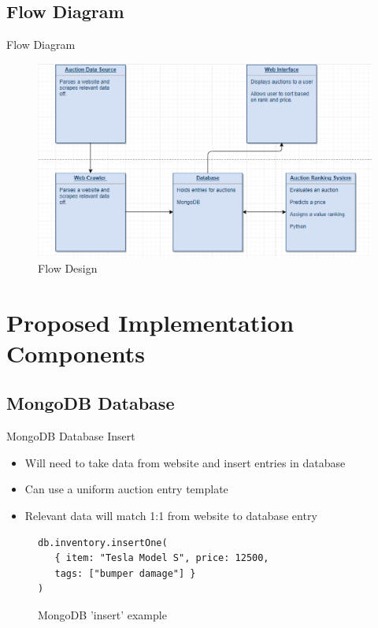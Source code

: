 \documentclass{beamer}
\begin{document}
\subsection{Flow Diagram}

\begin{frame}{Flow Diagram}

\begin{figure}[ht]
\centering
\includegraphics[scale=0.5]{flow_capture}
\caption{Flow Design}
\label{fig:flow}

\end{figure}

\end{frame}

\section{Proposed Implementation Components}

\subsection{MongoDB Database}
\begin{frame}[fragile=singleslide]{MongoDB Database Insert}
\begin{itemize}
\setlength\itemsep{2em}
\item Will need to take data from website and insert entries in database
\item Can use a uniform auction entry template
\item Relevant data will match 1:1 from website to database entry
\end{itemize}
\begin{figure}[ht]
\begin{itemize}


\begin{verbatim}
db.inventory.insertOne(
   { item: "Tesla Model S", price: 12500, 
   tags: ["bumper damage"] }
)
\end{verbatim}

\end{itemize}
\caption{MongoDB 'insert' example}
\end{figure}

\end{frame}
\end{document}
